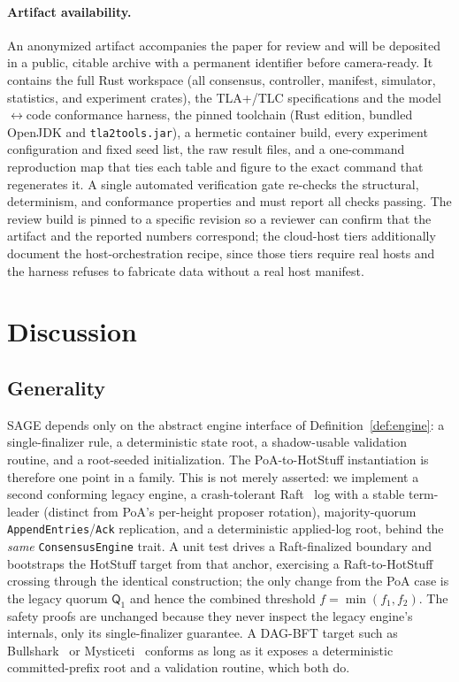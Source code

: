 \documentclass[journal]{IEEEtran}
\theoremstyle{definition}
\theoremstyle{remark}
\begin{document}
\paragraph{Artifact availability.}
An anonymized artifact accompanies the paper for review and will be deposited in a public,
citable archive with a permanent identifier before camera-ready. It contains the full Rust
workspace (all consensus, controller, manifest, simulator, statistics, and experiment crates),
the TLA+/TLC specifications and the model$\leftrightarrow$code conformance harness, the pinned
toolchain (Rust edition, bundled OpenJDK and \texttt{tla2tools.jar}), a hermetic container build,
every experiment configuration and fixed seed list, the raw result files, and a one-command
reproduction map that ties each table and figure to the exact command that regenerates it. A
single automated verification gate re-checks the structural, determinism, and
conformance properties and must report all checks passing. The review build is pinned to a
specific revision so a reviewer can confirm that the artifact and the reported numbers correspond;
the cloud-host tiers additionally document the host-orchestration recipe, since those tiers require
real hosts and the harness refuses to fabricate data without a real host manifest.

\section{Discussion}
\label{sec:discussion}

\subsection{Generality}
SAGE depends only on the abstract engine interface of Definition~\ref{def:engine}: a
single-finalizer rule, a deterministic state root, a shadow-usable validation routine, and a
root-seeded initialization. The PoA-to-HotStuff instantiation is therefore one point in a
family. This is not merely asserted: we implement a second conforming legacy engine, a
crash-tolerant Raft~\cite{raft} log with a stable term-leader (distinct from PoA's per-height
proposer rotation), majority-quorum \texttt{AppendEntries}/\texttt{Ack} replication, and a
deterministic applied-log root, behind the \emph{same} \texttt{ConsensusEngine} trait. A unit
test drives a Raft-finalized boundary and bootstraps the HotStuff target from that anchor,
exercising a Raft-to-HotStuff crossing through the identical construction; the only change from
the PoA case is the legacy quorum $\mathsf{Q}_1$ and hence the combined threshold
$f=\min(f_1,f_2)$. The safety proofs are unchanged because they never inspect the legacy engine's
internals, only its single-finalizer guarantee. A
DAG-BFT target such as Bullshark~\cite{bullshark} or Mysticeti~\cite{mysticeti} conforms as long
as it exposes a deterministic committed-prefix root and a validation routine, which both do.
\end{document}
